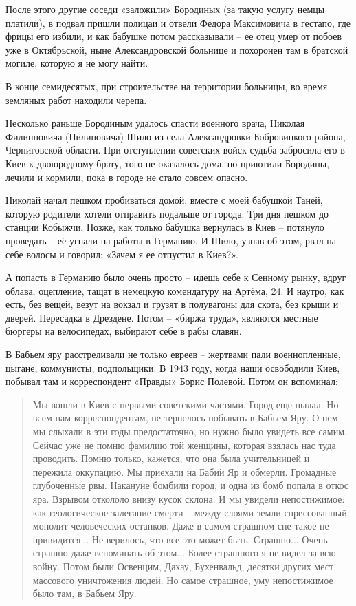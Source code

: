После этого другие соседи «заложили» Бородиных (за такую услугу немцы платили), в подвал пришли полицаи и отвели Федора Максимовича в гестапо, где фрицы его избили, и как бабушке потом рассказывали – ее отец умер от побоев уже в Октябрьской, ныне Александровской больнице и похоронен там в братской могиле, которую я не могу найти.

В конце семидесятых, при строительстве на территории больницы, во время земляных работ находили черепа.

Несколько раньше Бородиным удалось спасти военного врача, Николая Филипповича (Пилиповича) Шило из села Александровки Бобровицкого района, Черниговской области. При отступлении советских войск судьба забросила его в Киев к двоюродному брату, того не оказалось дома, но приютили Бородины, лечили и кормили, пока в городе не стало совсем опасно. 

Николай начал пешком пробиваться домой, вместе с моей бабушкой Таней, которую родители хотели отправить подальше от города. Три дня пешком до станции Кобыжчи. Позже, как только бабушка вернулась в Киев – потянуло проведать – её угнали на работы в Германию. И Шило, узнав об этом, рвал на себе волосы и говорил: «Зачем я ее отпустил в Киев?».

А попасть в Германию было очень просто – идешь себе к Сенному рынку, вдруг облава, оцепление, тащат в немецкую комендатуру на Артёма, 24. И наутро, как есть, без вещей, везут на вокзал и грузят в полувагоны для скота, без крыши и дверей. Пересадка в Дрездене. Потом – «биржа труда», являются местные бюргеры на велосипедах, выбирают себе в рабы славян.

В Бабьем яру расстреливали не только евреев – жертвами пали военнопленные, цыгане, коммунисты, подпольщики. В 1943 году, когда наши освободили Киев, побывал там и корреспондент «Правды» Борис Полевой. Потом он вспоминал:

\begin{quotation}
Мы вошли в Киев с первыми советскими частями.  Город еще пылал. Но всем нам корреспондентам, не терпелось побывать в Бабьем Яру. О нем мы слыхали в эти годы предостаточно, но нужно было увидеть все самим. Сейчас уже не помню фамилию той женщины, которая взялась нас туда проводить. Помню только, кажется, что она была учительницей и пережила оккупацию. Мы приехали на Бабий Яр и обмерли. Громадные глубоченные рвы. Накануне бомбили город, и одна из бомб попала в откос яра. Взрывом откололо внизу кусок склона. И мы увидели непостижимое: как геологическое залегание смерти – между слоями земли спрессованный монолит человеческих останков. Даже в самом страшном сне такое не привидится... Не верилось, что все это может быть. Страшно... Очень страшно даже вспоминать об этом... Более страшного я не видел за всю войну. Потом были Освенцим, Дахау, Бухенвальд, десятки других мест массового уничтожения людей. Но самое страшное, уму непостижимое было там, в Бабьем Яру.
\end{quotation}

